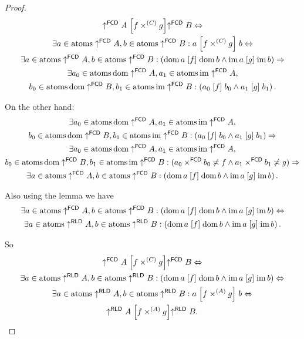\begin{proof}
\begin{multline*}
\uparrow^{\mathsf{FCD}}A\mathrel{\left[f\times^{(C)}g\right]}\uparrow^{\mathsf{FCD}}B\Leftrightarrow\\
\exists a\in\operatorname{atoms}\uparrow^{\mathsf{FCD}}A,b\in\operatorname{atoms}\uparrow^{\mathsf{FCD}}B:a\mathrel{\left[f\times^{(C)}g\right]}b\Leftrightarrow\\
\exists a\in\operatorname{atoms}\uparrow^{\mathsf{FCD}}A,b\in\operatorname{atoms}\uparrow^{\mathsf{FCD}}B:\left(\operatorname{dom} a\mathrel{\left[f\right]}\operatorname{dom} b\wedge\operatorname{im} a\mathrel{\left[g\right]}\operatorname{im} b\right)\Rightarrow\\
\exists a_{0}\in\operatorname{atoms}\operatorname{dom}\uparrow^{\mathsf{FCD}}A,a_{1}\in\operatorname{atoms}\operatorname{im}\uparrow^{\mathsf{FCD}}A,\\
b_{0}\in\operatorname{atoms}\operatorname{dom}\uparrow^{\mathsf{FCD}}B,b_{1}\in\operatorname{atoms}\operatorname{im}\uparrow^{\mathsf{FCD}}B:\left(a_{0}\mathrel{\left[f\right]}b_{0}\wedge a_{1}\mathrel{\left[g\right]}b_{1}\right).
\end{multline*}


On the other hand:
\begin{multline*}
\exists a_{0}\in\operatorname{atoms}\operatorname{dom}\uparrow^{\mathsf{FCD}}A,a_{1}\in\operatorname{atoms}\operatorname{im}\uparrow^{\mathsf{FCD}}A,\\
b_{0}\in\operatorname{atoms}\operatorname{dom}\uparrow^{\mathsf{FCD}}B,b_{1}\in\operatorname{atoms}\operatorname{im}\uparrow^{\mathsf{FCD}}B:\left(a_{0}\mathrel{\left[f\right]}b_{0}\wedge a_{1}\mathrel{\left[g\right]}b_{1}\right)\Rightarrow\\
\exists a_{0}\in\operatorname{atoms}\operatorname{dom}\uparrow^{\mathsf{FCD}}A,a_{1}\in\operatorname{atoms}\operatorname{im}\uparrow^{\mathsf{FCD}}A,\\
b_{0}\in\operatorname{atoms}\operatorname{dom}\uparrow^{\mathsf{FCD}}B,b_{1}\in\operatorname{atoms}\operatorname{im}\uparrow^{\mathsf{FCD}}B:(a_{0}\times^{\mathsf{FCD}}b_{0}\not\asymp f\wedge a_{1}\times^{\mathsf{FCD}}b_{1}\not\asymp g)\Rightarrow\\
\exists a\in\operatorname{atoms}\uparrow^{\mathsf{FCD}}A,b\in\operatorname{atoms}\uparrow^{\mathsf{FCD}}B:\left(\operatorname{dom} a\mathrel{\left[f\right]}\operatorname{dom} b\wedge\operatorname{im} a\mathrel{\left[g\right]}\operatorname{im} b\right).
\end{multline*}


Also using the lemma we have 
\begin{multline*}
\exists a\in\operatorname{atoms}\uparrow^{\mathsf{FCD}}A,b\in\operatorname{atoms}\uparrow^{\mathsf{FCD}}B:\left(\operatorname{dom} a\mathrel{\left[f\right]}\operatorname{dom} b\wedge\operatorname{im} a\mathrel{\left[g\right]}\operatorname{im} b\right)\Leftrightarrow\\
\exists a\in\operatorname{atoms}\uparrow^{\mathsf{RLD}}A,b\in\operatorname{atoms}\uparrow^{\mathsf{RLD}}B:\left(\operatorname{dom} a\mathrel{\left[f\right]}\operatorname{dom} b\wedge\operatorname{im} a\mathrel{\left[g\right]}\operatorname{im} b\right).
\end{multline*}


So 
\begin{multline*}
\uparrow^{\mathsf{FCD}}A\mathrel{\left[f\times^{(C)}g\right]}\uparrow^{\mathsf{FCD}}B\Leftrightarrow\\
\exists a\in\operatorname{atoms}\uparrow^{\mathsf{RLD}}A,b\in\operatorname{atoms}\uparrow^{\mathsf{RLD}}B:\left(\operatorname{dom} a\mathrel{\left[f\right]}\operatorname{dom} b\wedge\operatorname{im} a\mathrel{\left[g\right]}\operatorname{im} b\right)\Leftrightarrow\\
\exists a\in\operatorname{atoms}\uparrow^{\mathsf{RLD}}A,b\in\operatorname{atoms}\uparrow^{\mathsf{RLD}}B:a\mathrel{\left[f\times^{(A)}g\right]}b\Leftrightarrow\\
\uparrow^{\mathsf{RLD}}A\mathrel{\left[f\times^{(A)}g\right]}\uparrow^{\mathsf{RLD}}B.
\end{multline*}
\end{proof}
